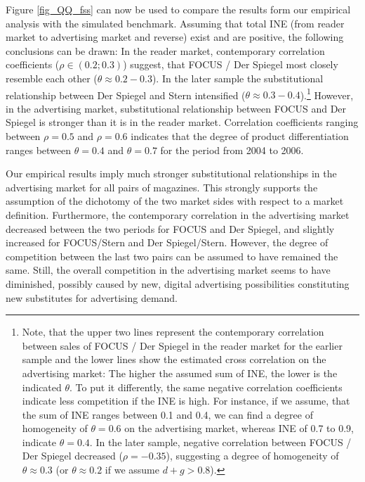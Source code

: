 \documentclass[12pt,a4paper,notitlepage]{article}
\begin{document}
Figure \ref{fig_QQ_fss} can now be used to compare the results form our empirical analysis with the simulated benchmark. Assuming that total INE (from reader market to advertising market and reverse) exist and are positive, the following conclusions can be drawn: In the reader market, contemporary correlation coefficients ($\rho \in (0.2;0.3)$) suggest, that FOCUS / Der Spiegel most closely resemble each other ($\theta\approx0.2-0.3$). In the later sample the substitutional relationship between Der Spiegel and Stern intensified ($\theta\approx0.3-0.4$).\footnote{Note, that the upper two lines represent the contemporary correlation between sales of FOCUS / Der Spiegel in the reader market for the earlier sample and the lower lines show the estimated cross correlation on the advertising market: The higher the assumed sum of INE, the lower is the indicated $\theta$. To put it differently, the same negative correlation coefficients indicate less competition if the INE is high. For instance, if we assume, that the sum of INE ranges between 0.1 and 0.4, we can find a degree of homogeneity of $\theta=0.6$ on the advertising market, whereas INE of 0.7 to 0.9, indicate $\theta=0.4$. In the later sample, negative correlation between FOCUS / Der Spiegel decreased ($\rho=-0.35$), suggesting a degree of homogeneity of $\theta\approx0.3$ (or $\theta\approx0.2$ if we assume $d+g>0.8$).} 
However, in the advertising market, substitutional relationship between FOCUS and Der Spiegel is stronger than it is in the reader market. Correlation coefficients ranging between $\rho=0.5$ and $\rho=0.6$ indicates that the degree of product differentiation ranges between $\theta=0.4$ and $\theta=0.7$ for the period from 2004 to 2006. 


%	
  
 

Our empirical results imply much stronger substitutional relationships in the advertising market for all pairs of magazines. This strongly supports the assumption of the dichotomy of the two market sides with respect to a market definition. Furthermore, the contemporary correlation in the advertising market decreased between the two periods for FOCUS and Der Spiegel, and slightly increased for FOCUS/Stern and Der Spiegel/Stern. However, the degree of competition between the last two pairs can be assumed to have remained the same. Still, the overall competition in the advertising market seems to have diminished, possibly caused by new, digital advertising possibilities constituting new substitutes for advertising demand. 
\end{document}
